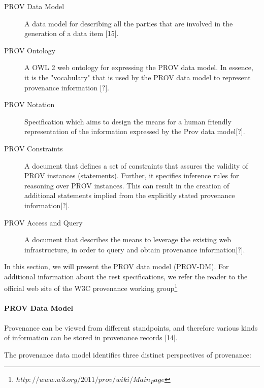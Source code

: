 \begin{description}
  \item[PROV Data Model] 
        A data model for describing all the parties that are involved in the generation of a data item [15].
  \item[PROV Ontology] 
        A OWL 2 web ontology for expressing the PROV data model. In essence, it is the "vocabulary" that is used by the PROV data model to represent provenance information [?].
  \item[PROV Notation] 
        Specification which aims to design the means for a human friendly representation of the information expressed by the Prov data model[?].
  \item[PROV Constraints] 
         A document that defines a set of constraints that assures the validity of PROV instances (statements). Further, it specifies inference rules for reasoning over PROV instances. This can result in the creation of additional statements implied from the explicitly stated provenance information[?].
  \item[PROV Access and Query ] 
        A document that describes the means to leverage the existing web infrastructure, in order to query and obtain provenance information[?].
\end{description}

In this section, we will present the PROV data model (PROV-DM). For additional information about the rest specifications, we refer the reader to the official web site  of the W3C provenance working group\footnote{$http://www.w3.org/2011/prov/wiki/Main_Page$}


\paragraph{PROV Data Model}
Provenance can be viewed from different standpoints, and therefore various kinds of information can be stored in provenance records [14].

The provenance data model identifies three distinct perspectives of provenance:

